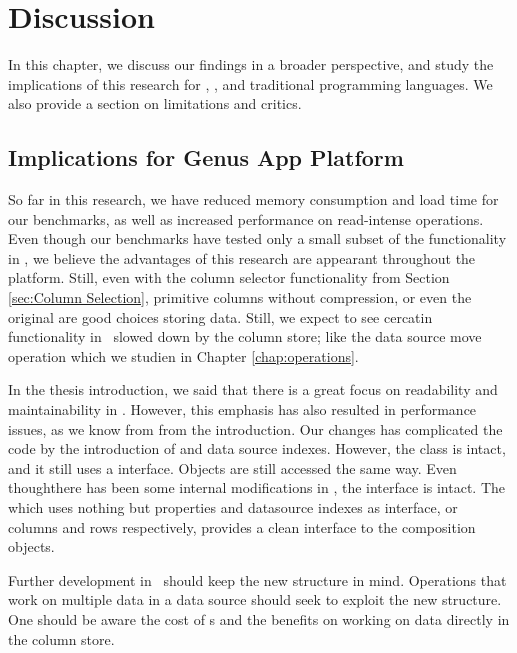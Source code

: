 \chapter{Discussion}
\label{chap:Discussion}
In this chapter, we discuss our findings in a broader perspective, and study the implications of this research for \gap, \mde, and traditional programming languages. We also provide a section on limitations and critics.

\clearpage

\section{Implications for Genus App Platform}
\label{sec:Implications for Genus App Platform}
So far in this research, we have reduced memory consumption and load time for our benchmarks, as well as increased performance on read-intense operations. Even though our benchmarks have tested only a small subset of the functionality in \gap, we believe the advantages of this research are appearant throughout the platform. Still, even with the column selector functionality from Section \ref{sec:Column Selection}, primitive columns without compression, or even the original  are good choices storing data. Still, we expect to see cercatin functionality in \gap~slowed down by the column store; like the data source move operation which we studien in Chapter \ref{chap:operations}.

In the thesis introduction, we said that there is a great focus on readability and maintainability in \gap. However, this emphasis has also resulted in performance issues, as we know from from the introduction. Our changes has complicated the code by the introduction of  and data source indexes. However, the  class is intact, and it still uses a  interface. Objects are still accessed the same way. Even thoughthere has been some internal modifications in , the interface is intact. The  which uses nothing but properties and datasource indexes as interface, or columns and rows respectively, provides a clean interface to the composition objects.

Further development in \gap~should keep the new structure in mind. Operations that work on multiple data in a data source should seek to exploit the new structure. One should be aware the cost of s and the benefits on working on data directly in the column store. 

